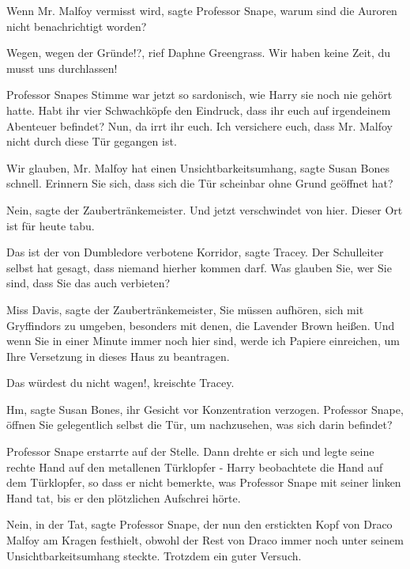 \glqq{}Wenn Mr. Malfoy vermisst wird\grqq{}, sagte Professor Snape, \glqq{}warum
sind die Auroren nicht benachrichtigt worden?\grqq{}

\glqq{}Wegen, wegen der Gründe!?\grqq{}, rief Daphne Greengrass. \glqq{}Wir haben
keine Zeit, du musst uns durchlassen!\grqq{}

Professor Snapes Stimme war jetzt so sardonisch, wie Harry sie noch nie gehört
hatte. \glqq{}Habt ihr vier Schwachköpfe den Eindruck, dass ihr euch auf
irgendeinem Abenteuer befindet? Nun, da irrt ihr euch. Ich versichere euch, dass
Mr. Malfoy nicht durch diese Tür gegangen ist.\grqq{}

\glqq{}Wir glauben, Mr. Malfoy hat einen Unsichtbarkeitsumhang\grqq{}, sagte
Susan Bones schnell. \glqq{}Erinnern Sie sich, dass sich die Tür scheinbar ohne
Grund geöffnet hat?\grqq{}

\glqq{}Nein\grqq{}, sagte der Zaubertränkemeister. \glqq{}Und jetzt verschwindet
von hier. Dieser Ort ist für heute tabu.\grqq{}

\glqq{}Das ist der von Dumbledore verbotene Korridor\grqq{}, sagte Tracey. \glqq{}
Der Schulleiter selbst hat gesagt, dass niemand hierher kommen darf. Was glauben
Sie, wer Sie sind, dass Sie das auch verbieten?\grqq{}

\glqq{}Miss Davis\grqq{}, sagte der Zaubertränkemeister, \glqq{}Sie müssen
aufhören, sich mit Gryffindors zu umgeben, besonders mit denen, die Lavender
Brown heißen. Und wenn Sie in einer Minute immer noch hier sind, werde ich
Papiere einreichen, um Ihre Versetzung in dieses Haus zu beantragen.\grqq{}

\glqq{}Das würdest du nicht wagen!\grqq{}, kreischte Tracey.

\glqq{}Hm\grqq{}, sagte Susan Bones, ihr Gesicht vor Konzentration verzogen.
\glqq{}Professor Snape, öffnen Sie gelegentlich selbst die Tür, um nachzusehen,
was sich darin befindet?\grqq{}

Professor Snape erstarrte auf der Stelle. Dann drehte er sich und legte seine
rechte Hand auf den metallenen Türklopfer - Harry beobachtete die Hand auf dem
Türklopfer, so dass er nicht bemerkte, was Professor Snape mit seiner linken
Hand tat, bis er den plötzlichen Aufschrei hörte.

\glqq{}Nein, in der Tat\grqq{}, sagte Professor Snape, der nun den erstickten
Kopf von Draco Malfoy am Kragen festhielt, obwohl der Rest von Draco immer noch
unter seinem Unsichtbarkeitsumhang steckte. \glqq{}Trotzdem ein guter Versuch.\grqq{}

